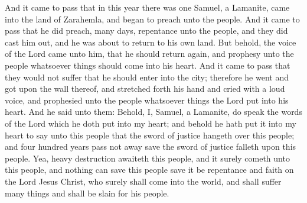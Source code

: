 And it came to pass that in this year there was one Samuel, a Lamanite, came into the land of Zarahemla, and began to preach unto the people. And it came to pass that he did preach, many days, repentance unto the people, and they did cast him out, and he was about to return to his own land.
\bverse \iffalse But behold, the voice of the Lord came unto him, that he should return again, and prophesy unto the people whatsoever things should come into his heart. \fi
But behold, the voice of the Lord came unto him, that he should return again, and prophesy unto the people whatsoever things should come into his heart.
\bverse \iffalse And it came to pass that they would not suffer that he should enter into the city; therefore he went and got upon the wall thereof, and stretched forth his hand and cried with a loud voice, and prophesied unto the people whatsoever things the Lord put into his heart. \fi
And it came to pass that they would not suffer that he should enter into the city; therefore he went and got upon the wall thereof, and stretched forth his hand and cried with a loud voice, and prophesied unto the people whatsoever things the Lord put into his heart.
\bverse \iffalse And he said unto them: Behold, I, Samuel, a Lamanite, do speak the words of the Lord which he doth put into my heart; and behold he hath put it into my heart to say unto this people that the sword of justice hangeth over this people; and four hundred years pass not away save the sword of justice falleth upon this people. \fi
And he said unto them: Behold, I, Samuel, a Lamanite, do speak the words of the Lord which he doth put into my heart; and behold he hath put it into my heart to say unto this people that the sword of justice hangeth over this people; and four hundred years pass not away save the sword of justice falleth upon this people.
\bverse \iffalse Yea, heavy destruction awaiteth this people, and it surely cometh unto this people, and nothing can save this people save it be repentance and faith on the Lord Jesus Christ, who surely shall come into the world, and shall suffer many things and shall be slain for his people. \fi
Yea, heavy destruction awaiteth this people, and it surely cometh unto this people, and nothing can save this people save it be repentance and faith on the Lord Jesus Christ, who surely shall come into the world, and shall suffer many things and shall be slain for his people.
\bverse \iffalse And behold, an angel of the Lord hath declared it unto me, and he did bring glad tidings to my soul. And behold, I was sent unto you to declare it unto you also, that ye might have glad tidings; but behold ye would not receive me. \fi
